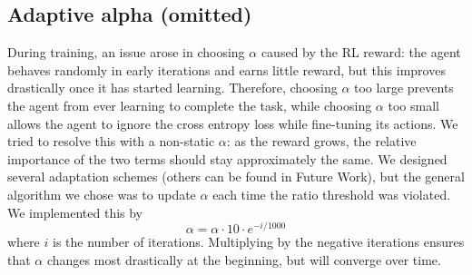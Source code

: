 \subsection{Adaptive alpha (omitted)}
During training, an issue arose in choosing $\alpha$ caused by the RL reward: the agent behaves randomly in early iterations and earns little reward, but this improves drastically once it has started learning. Therefore, choosing $\alpha$ too large prevents the agent from ever learning to complete the task, while choosing $\alpha$ too small allows the agent to ignore the cross entropy loss while fine-tuning its actions. We tried to resolve this with a non-static $\alpha$: as the reward grows, the relative importance of the two terms should stay approximately the same. We designed several adaptation schemes (others can be found in Future Work), but the general algorithm we chose was to update $\alpha$ each time the ratio threshold was violated. We implemented this by
\begin{equation}
    \alpha = \alpha \cdot 10 \cdot e^{-i / 1000}
\end{equation}
where $i$ is the number of iterations. Multiplying by the negative iterations ensures that $\alpha$ changes most drastically at the beginning, but will converge over time.